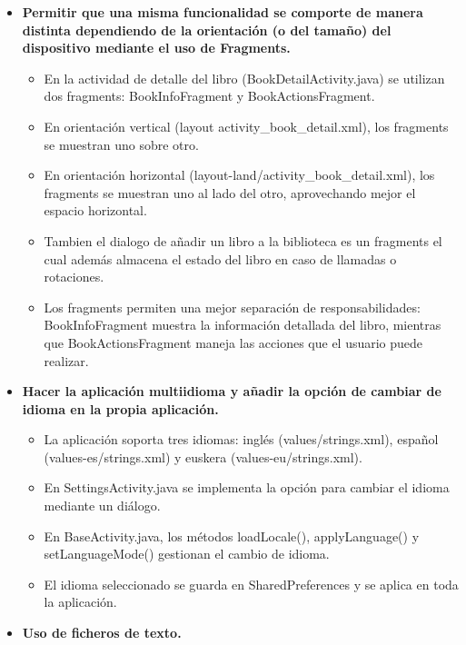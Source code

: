 \documentclass[a4paper,10pt]{report}
\begin{document}
      \begin{itemize}
        \item \textbf{Permitir que una misma funcionalidad se comporte de manera distinta dependiendo de la orientación (o del tamaño) del dispositivo mediante el uso de Fragments.}
        \begin{itemize}
          \item En la actividad de detalle del libro (BookDetailActivity.java) se utilizan dos fragments: BookInfoFragment y BookActionsFragment\cite{android_fragments}.
          \item En orientación vertical (layout activity\_book\_detail.xml), los fragments se muestran uno sobre otro.
          \item En orientación horizontal (layout-land/activity\_book\_detail.xml), los fragments se muestran uno al lado del otro, aprovechando mejor el espacio horizontal.
          \item Tambien el dialogo de añadir un libro a la biblioteca es un fragments el cual además almacena el estado del libro en caso de llamadas o rotaciones.
          \item Los fragments permiten una mejor separación de responsabilidades: BookInfoFragment muestra la información detallada del libro, mientras que BookActionsFragment maneja las acciones que el usuario puede realizar.
        \end{itemize}
        \item \textbf{Hacer la aplicación multiidioma y añadir la opción de cambiar de idioma en la propia aplicación.}
        \begin{itemize}
          \item La aplicación soporta tres idiomas: inglés (values/strings.xml), español (values-es/strings.xml) y euskera (values-eu/strings.xml)\cite{android_localization}.
          \item En SettingsActivity.java se implementa la opción para cambiar el idioma mediante un diálogo.
          \item En BaseActivity.java, los métodos loadLocale(), applyLanguage() y setLanguageMode() gestionan el cambio de idioma.
          \item El idioma seleccionado se guarda en SharedPreferences y se aplica en toda la aplicación.
        \end{itemize}
        \item \textbf{Uso de ficheros de texto.}
        \begin{itemize}

\end{itemize}
\end{itemize}
\end{document}
